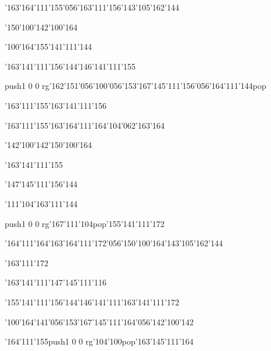 \null\vfill\ipa\centerline{\enskip\enskip\enskip\enskip\enskip\char'163\char'164\char'111\char'155\char'056\char'163\char'111\char'156\enskip\char'143\char'105\char'162\char'144}\medskip\centerline{\enskip\char'150\char'100\char'142\enskip\char'100\char'164\enskip\enskip\enskip\enskip\enskip\enskip\enskip\enskip}\medskip\centerline{\enskip\char'100\char'164\enskip\enskip\enskip\enskip\enskip\enskip\enskip\enskip\enskip\enskip\enskip\enskip\char'155\char'141\char'111\char'144}\medskip\centerline{\enskip\enskip\enskip\enskip\char'163\char'141\char'111\char'156\char'144\enskip\enskip\enskip\enskip\enskip\char'146\char'141\char'111\char'155}\medskip\centerline{\enskip\enskip\enskip\enskip\pdfcolorstack\match push{1 0 0 rg}\char'162\char'151\char'056\char'100\char'056\char'153\char'167\char'145\char'111\char'156\char'056\char'164\char'111\char'144\pdfcolorstack\match pop{}}\medskip\centerline{\enskip\char'163\char'111\char'155\enskip\enskip\enskip\enskip\char'163\char'141\char'111\char'156}\medskip\vfill\footline{\hfil\tt\folio\hfil}\eject
\null\vfill\ipa\centerline{\enskip\char'163\char'111\char'155\enskip\char'163\char'164\char'111\char'164\enskip\enskip\enskip\enskip\enskip\char'104\char'062\char'163\char'164}\medskip\centerline{\enskip\char'142\char'100\char'142\enskip\enskip\enskip\enskip\char'150\char'100\char'164\enskip\enskip\enskip\enskip}\medskip\centerline{\enskip\enskip\enskip\enskip\enskip\enskip\enskip\enskip\enskip\enskip\enskip\enskip\enskip\enskip\char'163\char'141\char'111\char'155}\medskip\centerline{\enskip\enskip\enskip\enskip\char'147\char'145\char'111\char'156\char'144\enskip\enskip\enskip\enskip\enskip\enskip\enskip\enskip\enskip}\medskip\centerline{\enskip\char'111\char'104\enskip\enskip\enskip\enskip\enskip\enskip\enskip\enskip\enskip\char'163\char'111\char'144}\medskip\centerline{\enskip\pdfcolorstack\match push{1 0 0 rg}\char'167\char'111\char'104\pdfcolorstack\match pop{}\enskip\enskip\enskip\enskip\char'155\char'141\char'111\char'172}\medskip\vfill\footline{\hfil\tt\folio\hfil}\eject
\null\vfill\ipa\centerline{\enskip\char'164\char'111\char'164\enskip\char'163\char'164\char'111\char'172\char'056\char'150\char'100\char'164\enskip\char'143\char'105\char'162\char'144}\medskip\centerline{\enskip\enskip\enskip\enskip\enskip\enskip\enskip\enskip\enskip\enskip\enskip\enskip\char'163\char'111\char'172}\medskip\centerline{\enskip\enskip\enskip\enskip\enskip\enskip\enskip\enskip\enskip\enskip\char'163\char'141\char'111\enskip\char'147\char'145\char'111\char'116}\medskip\centerline{\enskip\enskip\enskip\enskip\char'155\char'141\char'111\char'156\char'144\enskip\char'146\char'141\char'111\enskip\char'163\char'141\char'111\char'172}\medskip\centerline{\enskip\char'100\char'164\enskip\enskip\enskip\char'141\char'056\char'153\char'167\char'145\char'111\char'164\char'056\char'142\char'100\char'142}\medskip\centerline{\enskip\char'164\char'111\char'155\enskip\pdfcolorstack\match push{1 0 0 rg}\char'104\char'100\pdfcolorstack\match pop{}\enskip\char'163\char'145\char'111\char'164}\medskip\vfill\footline{\hfil\tt\folio\hfil}\eject\bye